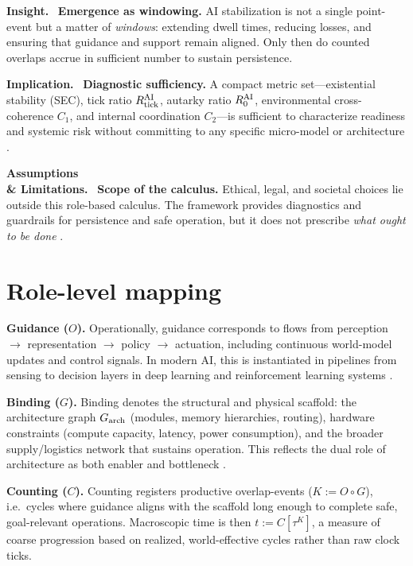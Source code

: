 \documentclass[12pt,a4paper,oneside]{scrreprt}
\newenvironment{insight}{\par\vspace{0.5em}\noindent\textbf{Insight.}\ }{\par\vspace{0.5em}}
\newenvironment{implication}{\par\vspace{0.5em}\noindent\textbf{Implication.}\ }{\par\vspace{0.5em}}
\newenvironment{limitation}{\par\vspace{0.5em}\noindent\textbf{Assumptions \\ \& Limitations.}\ }{\par\vspace{0.5em}}
\begin{document}
\begin{insight}
\textbf{Emergence as windowing.} 
AI stabilization is not a single point-event but a matter of \emph{windows}: extending dwell times, reducing losses, and ensuring that guidance and support remain aligned. 
Only then do counted overlaps accrue in sufficient number to sustain persistence.
\end{insight}

\begin{implication}
\textbf{Diagnostic sufficiency.} 
A compact metric set—existential stability (SEC), tick ratio $R_{\rm tick}^{\rm AI}$, autarky ratio $R_0^{\rm AI}$, environmental cross-coherence $C_1$, and internal coordination $C_2$—is sufficient to characterize readiness and systemic risk without committing to any specific micro-model or architecture \cite{LeCun2015,Silver2021,Mitchell2023}.
\end{implication}

\begin{limitation}
\textbf{Scope of the calculus.} 
Ethical, legal, and societal choices lie outside this role-based calculus. 
The framework provides diagnostics and guardrails for persistence and safe operation, but it does not prescribe \emph{what ought to be done} \cite{Bostrom2014,Floridi2019,Jobin2019}.
\end{limitation}


\section{Role-level mapping}\label{sec:ai-mapping}
\textbf{Guidance ($O$).} Operationally, guidance corresponds to flows from perception $\to$ representation $\to$ policy $\to$ actuation, including continuous world-model updates and control signals. In modern AI, this is instantiated in pipelines from sensing to decision layers in deep learning and reinforcement learning systems \cite{LeCun2015, Silver2021}.

\textbf{Binding ($G$).} Binding denotes the structural and physical scaffold: the architecture graph $G_{\rm arch}$ (modules, memory hierarchies, routing), hardware constraints (compute capacity, latency, power consumption), and the broader supply/logistics network that sustains operation. This reflects the dual role of architecture as both enabler and bottleneck \cite{Mitchell2023, Patterson2021}.

\textbf{Counting ($C$).} Counting registers productive overlap-events ($K:=O\!\circ G$), i.e.\ cycles where guidance aligns with the scaffold long enough to complete safe, goal-relevant operations. Macroscopic time is then $t:=C[\tau^K]$, a measure of coarse progression based on realized, world-effective cycles rather than raw clock ticks.
\end{document}
